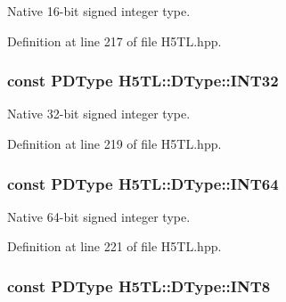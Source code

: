 Native 16-\/bit signed integer type. 



Definition at line 217 of file H5\-T\-L.\-hpp.

\hypertarget{class_h5_t_l_1_1_d_type_aeac9765985f2a8195e30a84c3b23af9f}{
\subsubsection[{I\-N\-T32}]{\setlength{\rightskip}{0pt plus 5cm}const {\bf P\-D\-Type} H5\-T\-L\-::\-D\-Type\-::\-I\-N\-T32\hspace{0.3cm}{\ttfamily [static]}}}\label{class_h5_t_l_1_1_d_type_aeac9765985f2a8195e30a84c3b23af9f}


Native 32-\/bit signed integer type. 



Definition at line 219 of file H5\-T\-L.\-hpp.

\hypertarget{class_h5_t_l_1_1_d_type_ae8b348ef9c7faa11383fc84389ff8ffc}{
\subsubsection[{I\-N\-T64}]{\setlength{\rightskip}{0pt plus 5cm}const {\bf P\-D\-Type} H5\-T\-L\-::\-D\-Type\-::\-I\-N\-T64\hspace{0.3cm}{\ttfamily [static]}}}\label{class_h5_t_l_1_1_d_type_ae8b348ef9c7faa11383fc84389ff8ffc}


Native 64-\/bit signed integer type. 



Definition at line 221 of file H5\-T\-L.\-hpp.

\hypertarget{class_h5_t_l_1_1_d_type_ac2a6c1610fcc3d1a56ba67bff203f5e8}{
\subsubsection[{I\-N\-T8}]{\setlength{\rightskip}{0pt plus 5cm}const {\bf P\-D\-Type} H5\-T\-L\-::\-D\-Type\-::\-I\-N\-T8\hspace{0.3cm}{\ttfamily [static]}}}\label{class_h5_t_l_1_1_d_type_ac2a6c1610fcc3d1a56ba67bff203f5e8}


